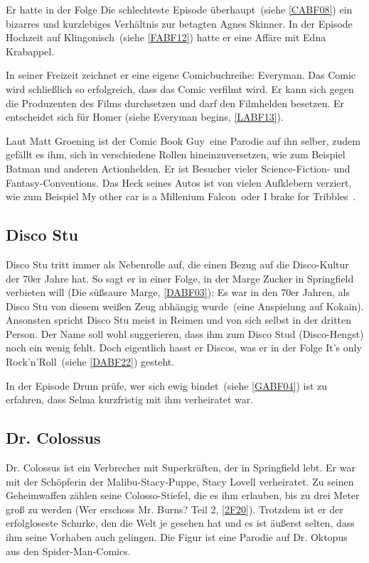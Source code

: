 Er hatte in der Folge \glqq Die schlechteste Episode überhaupt\grqq\ (siehe \ref{CABF08}) ein bizarres und kurzlebiges Verhältnis zur betagten Agnes Skinner. In der Episode \glqq Hochzeit auf Klingonisch\grqq\ (siehe \ref{FABF12}) hatte er eine Affäre mit Edna Krabappel.

In seiner Freizeit zeichnet er eine eigene Comicbuchreihe: Everyman. Das Comic wird schließlich so erfolgreich, dass das Comic verfilmt wird. Er kann sich gegen die Produzenten des Films durchsetzen und darf den Filmhelden besetzen. Er entscheidet sich für Homer (siehe \glqq Everyman begins\grqq , \ref{LABF13}).

Laut Matt Groening ist der \glqq Comic Book Guy\grqq\ eine Parodie auf ihn selber, zudem gefällt es ihm, sich in verschiedene Rollen hineinzuversetzen, wie zum Beispiel Batman und anderen Actionhelden. Er ist Besucher vieler Science-Fiction- und Fantasy-Conventions. Das Heck seines Autos ist von vielen Aufklebern verziert, wie zum Beispiel \glqq My other car is a Millenium Falcon\grqq\ oder \glqq I brake for Tribbles\grqq\ \cite{Wikipedia}.


\subsection{Disco Stu}
Disco Stu tritt immer als Nebenrolle auf, die einen Bezug auf die Disco-Kultur der 70er Jahre hat. So sagt er in einer Folge, in der Marge Zucker in Springfield verbieten will (\glqq Die süßsaure Marge\grqq , \ref{DABF03}): \glqq Es war in den 70er Jahren, als Disco Stu von diesem weißen Zeug abhängig wurde\grqq\ (eine Anspielung auf Kokain). Ansonsten spricht Disco Stu meist in Reimen und von sich selbst in der dritten Person. Der Name soll wohl suggerieren, dass ihm zum Disco Stud (Disco-Hengst) noch ein wenig fehlt. Doch eigentlich hasst er Discos, was er in der Folge \glqq It's only Rock'n'Roll\grqq\ (siehe \ref{DABF22}) gesteht.

In der Episode \glqq Drum prüfe, wer sich ewig bindet\grqq\ (siehe \ref{GABF04}) ist zu erfahren, dass Selma kurzfristig mit ihm verheiratet war.

\subsection{Dr. Colossus}
Dr. Colossus ist ein Verbrecher mit Superkräften, der in Springfield lebt. Er war mit der Schöpferin der Malibu-Stacy-Puppe, Stacy Lovell verheiratet. Zu seinen Geheimwaffen zählen seine Colosso-Stiefel, die es ihm erlauben, bis zu drei Meter groß zu werden (\glqq Wer erschoss Mr. Burns? Teil 2\grqq , \ref{2F20}). Trotzdem ist er der erfolgloseste Schurke, den die Welt je gesehen hat und es ist äußerst selten, dass ihm seine Vorhaben auch gelingen. Die Figur ist eine Parodie auf Dr. Oktopus aus den Spider-Man-Comics.


